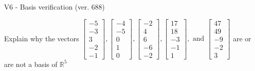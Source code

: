 \begin{exercise}
  \begin{exerciseTitle}V6 - Basis verification (ver. 688)\end{exerciseTitle}
  \begin{exerciseStatement}
    Explain why the vectors \(\left[\begin{array}{r}
-5 \\
-3 \\
3 \\
-2 \\
-1
\end{array}\right] , \left[\begin{array}{r}
-4 \\
-5 \\
0 \\
1 \\
0
\end{array}\right] , \left[\begin{array}{r}
-2 \\
4 \\
6 \\
-6 \\
-2
\end{array}\right] , \left[\begin{array}{r}
17 \\
18 \\
-3 \\
-1 \\
1
\end{array}\right] , \text{ and } \left[\begin{array}{r}
47 \\
49 \\
-9 \\
-2 \\
3
\end{array}\right]\) are or are not a basis of \(\mathbb{R}^5\)	



\end{exerciseStatement}
\end{exercise}
